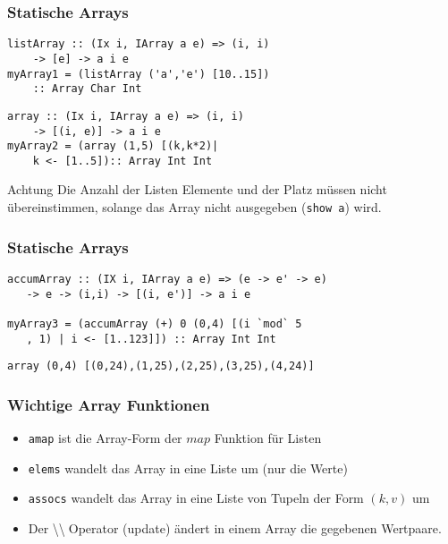\begin{frame}[fragile]
\frametitle{Statische Arrays}
\begin{lstlisting}
listArray :: (Ix i, IArray a e) => (i, i) 
    -> [e] -> a i e
myArray1 = (listArray ('a','e') [10..15]) 
    :: Array Char Int
\end{lstlisting}	
\pause
\begin{lstlisting}
array :: (Ix i, IArray a e) => (i, i) 
    -> [(i, e)] -> a i e
myArray2 = (array (1,5) [(k,k*2)| 
    k <- [1..5]):: Array Int Int
\end{lstlisting}
\begin{alertblock}{Achtung}
Die Anzahl der Listen Elemente und der Platz müssen nicht übereinstimmen, solange das Array nicht ausgegeben (\lstinline|show a|) wird. 
\end{alertblock}
\end{frame}

\begin{frame}[fragile]
\frametitle{Statische Arrays}
\begin{lstlisting}
accumArray :: (IX i, IArray a e) => (e -> e' -> e) 
   -> e -> (i,i) -> [(i, e')] -> a i e

myArray3 = (accumArray (+) 0 (0,4) [(i `mod` 5
   , 1) | i <- [1..123]]) :: Array Int Int
\end{lstlisting}	
\pause
\begin{block}{\vspace*{-3ex}}
\lstinline|array (0,4) [(0,24),(1,25),(2,25),(3,25),(4,24)]|
\end{block}
\end{frame}

\begin{frame}
\frametitle{Wichtige Array Funktionen}
\begin{block}{\vspace*{-3ex}}
\begin{itemize}
\item \lstinline|amap| ist die Array-Form der $map$ Funktion für Listen
\item \lstinline|elems| wandelt das Array in eine Liste um (nur die Werte)
\item \lstinline|assocs| wandelt das Array in eine Liste von Tupeln der Form $(k, v)$ um
\item Der \textbackslash\textbackslash$\;$Operator (update) ändert in einem Array die gegebenen Wertpaare.
\end{itemize}
\end{block}
\end{frame}

